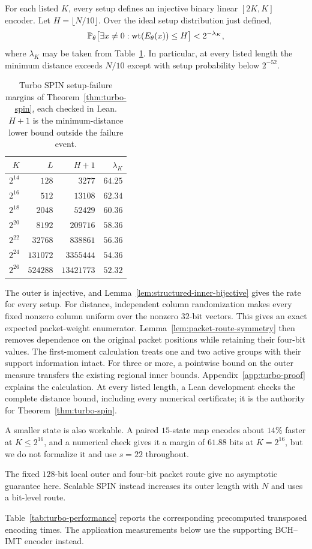 \begin{theorem}
\label{thm:turbo-spin}
For each listed $K$, every setup defines an injective binary linear
$[2K,K]$ encoder. Let $H=\lfloor N/10\rfloor$. Over the ideal setup
distribution just defined,
\[
  \mathbb P_\theta\bigl[\exists x\ne0:\operatorname{wt}(E_\theta(x))\le H\bigr]
  <2^{-\lambda_K},
\]
where $\lambda_K$ may be taken from Table~\ref{tab:turbo-margins}.
In particular, at every listed length the minimum distance exceeds $N/10$
except with setup probability below $2^{-52}$.
\end{theorem}

\begin{table}[tb]
\centering
\caption{Turbo SPIN setup-failure margins of Theorem~\ref{thm:turbo-spin},
each checked in Lean. $H+1$ is the minimum-distance lower bound outside
the failure event.}
\label{tab:turbo-margins}
\setlength{\tabcolsep}{8pt}
\begin{tabular}{@{}rrrr@{}}
\toprule
$K$ & $L$ & $H+1$ & $\lambda_K$ \\
\midrule
$2^{14}$ & $128$ & $3277$ & $64.25$ \\
$2^{16}$ & $512$ & $13108$ & $62.34$ \\
$2^{18}$ & $2048$ & $52429$ & $60.36$ \\
$2^{20}$ & $8192$ & $209716$ & $58.36$ \\
$2^{22}$ & $32768$ & $838861$ & $56.36$ \\
$2^{24}$ & $131072$ & $3355444$ & $54.36$ \\
$2^{26}$ & $524288$ & $13421773$ & $52.32$ \\
\bottomrule
\end{tabular}
\end{table}

The outer is injective, and Lemma~\ref{lem:structured-inner-bijective}
gives the rate for every setup. For distance, independent column
randomization makes every fixed nonzero column uniform over the nonzero
$32$-bit vectors. This gives an exact expected packet-weight enumerator.
Lemma~\ref{lem:packet-route-symmetry} then removes dependence on the
original packet positions while retaining their four-bit values.
The first-moment calculation treats one and two active groups with their
support information intact. For three or more, a pointwise bound on the
outer measure transfers the existing regional inner bounds.
Appendix~\ref{app:turbo-proof} explains the calculation. At every listed
length, a Lean development checks the complete distance bound, including
every numerical certificate; it is the authority for
Theorem~\ref{thm:turbo-spin}.

A smaller state is also workable. A paired $15$-state map encodes about
$14\%$ faster at $K\le2^{16}$, and a numerical check gives it a margin of
$61.88$ bits at $K=2^{16}$, but we do not formalize it and use $s=22$
throughout.

The fixed $128$-bit local outer and four-bit packet route give no
asymptotic guarantee here. Scalable SPIN instead increases its outer
length with $N$ and uses a bit-level route.

Table~\ref{tab:turbo-performance} reports the corresponding precomputed
transposed encoding times. The application measurements below use the
supporting BCH--IMT encoder instead.
